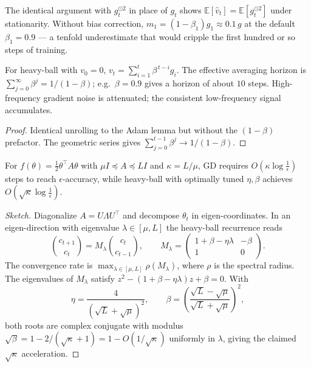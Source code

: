 The identical argument with $g_t^{\odot 2}$ in place of $g_t$ shows $\mathbb{E}[\hat v_t] = \mathbb{E}[g_t^{\odot 2}]$ under stationarity. Without bias correction, $m_1 = (1-\beta_1)g_1 \approx 0.1\, g$ at the default $\beta_1 = 0.9$ --- a tenfold underestimate that would cripple the first hundred or so steps of training.

\begin{proposition}
For heavy-ball with $v_0 = 0$, $v_t = \sum_{i=1}^t \beta^{\,t-i} g_i$. The effective averaging horizon is $\sum_{j=0}^\infty \beta^j = 1/(1-\beta)$; e.g.\ $\beta = 0.9$ gives a horizon of about $10$ steps. High-frequency gradient noise is attenuated; the consistent low-frequency signal accumulates.
\end{proposition}
\begin{proof}
Identical unrolling to the Adam lemma but without the $(1-\beta)$ prefactor. The geometric series gives $\sum_{j=0}^{t-1}\beta^j \to 1/(1-\beta)$.
\end{proof}

\begin{theorem}
For $f(\theta) = \tfrac{1}{2}\theta^\top A \theta$ with $\mu I \preceq A \preceq L I$ and $\kappa = L/\mu$, GD requires $O(\kappa \log \tfrac{1}{\epsilon})$ steps to reach $\epsilon$-accuracy, while heavy-ball with optimally tuned $\eta, \beta$ achieves $O(\sqrt{\kappa}\log \tfrac{1}{\epsilon})$.
\end{theorem}
\begin{proof}[Sketch]
Diagonalize $A = U\Lambda U^\top$ and decompose $\theta_t$ in eigen-coordinates. In an eigen-direction with eigenvalue $\lambda \in [\mu, L]$ the heavy-ball recurrence reads
\[
\binom{c_{t+1}}{c_t} = M_\lambda \binom{c_t}{c_{t-1}}, \qquad M_\lambda = \begin{pmatrix} 1 + \beta - \eta\lambda & -\beta \\ 1 & 0 \end{pmatrix}.
\]
The convergence rate is $\max_{\lambda \in [\mu, L]} \rho(M_\lambda)$, where $\rho$ is the spectral radius. The eigenvalues of $M_\lambda$ satisfy $z^2 - (1+\beta-\eta\lambda)z + \beta = 0$. With
\[
\eta = \frac{4}{(\sqrt{L}+\sqrt{\mu})^2}, \qquad \beta = \left(\frac{\sqrt{L}-\sqrt{\mu}}{\sqrt{L}+\sqrt{\mu}}\right)^2,
\]
both roots are complex conjugate with modulus $\sqrt{\beta} = 1 - 2/(\sqrt{\kappa}+1) = 1 - O(1/\sqrt{\kappa})$ uniformly in $\lambda$, giving the claimed $\sqrt{\kappa}$ acceleration.
\end{proof}

